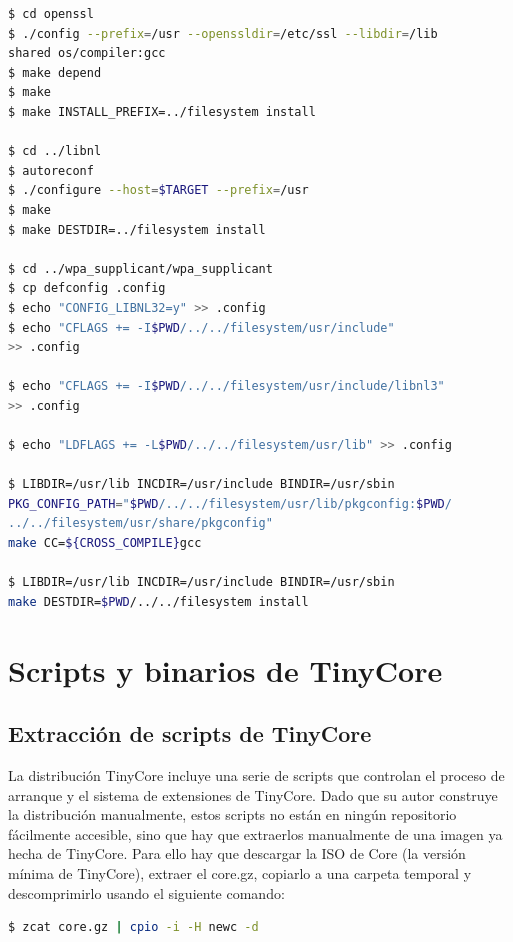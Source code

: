\documentclass{tfg}
\begin{document}
\clearpage
\begin{lstlisting}[language=bash,caption=Compilacion de WPA Supplicant]
$ cd openssl
$ ./config --prefix=/usr --openssldir=/etc/ssl --libdir=/lib
shared os/compiler:gcc
$ make depend
$ make
$ make INSTALL_PREFIX=../filesystem install

$ cd ../libnl
$ autoreconf
$ ./configure --host=$TARGET --prefix=/usr
$ make
$ make DESTDIR=../filesystem install

$ cd ../wpa_supplicant/wpa_supplicant
$ cp defconfig .config
$ echo "CONFIG_LIBNL32=y" >> .config
$ echo "CFLAGS += -I$PWD/../../filesystem/usr/include"
>> .config

$ echo "CFLAGS += -I$PWD/../../filesystem/usr/include/libnl3"
>> .config

$ echo "LDFLAGS += -L$PWD/../../filesystem/usr/lib" >> .config

$ LIBDIR=/usr/lib INCDIR=/usr/include BINDIR=/usr/sbin
PKG_CONFIG_PATH="$PWD/../../filesystem/usr/lib/pkgconfig:$PWD/
../../filesystem/usr/share/pkgconfig"
make CC=${CROSS_COMPILE}gcc

$ LIBDIR=/usr/lib INCDIR=/usr/include BINDIR=/usr/sbin
make DESTDIR=$PWD/../../filesystem install
\end{lstlisting}
%

\section{Scripts y binarios de TinyCore}
\subsection{Extracción de scripts de TinyCore}
La distribución TinyCore incluye una serie de scripts que controlan el proceso de arranque y el sistema de extensiones
de TinyCore. Dado que su autor construye la distribución manualmente, estos scripts no están en ningún repositorio
fácilmente accesible, sino que hay que extraerlos manualmente de una imagen ya hecha de TinyCore. Para ello hay que
descargar la ISO de Core (la versión mínima de TinyCore), extraer el core.gz, copiarlo a una carpeta temporal y
descomprimirlo usando el siguiente comando:

\begin{lstlisting}[language=bash,caption=Descompresion de core.gz]
$ zcat core.gz | cpio -i -H newc -d
\end{lstlisting}
\iffalse $ \fi %
\end{document}
